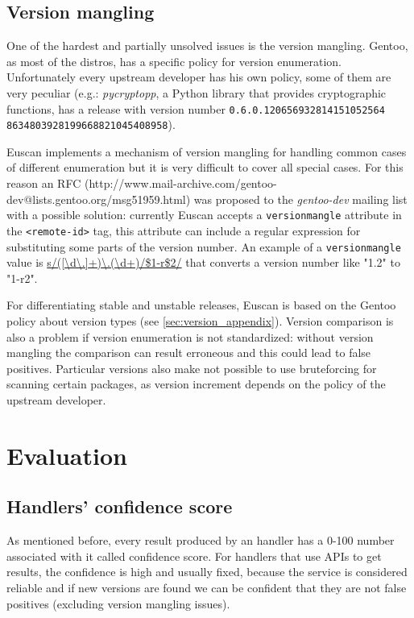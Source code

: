 \subsection{Version mangling}
One of the hardest and partially unsolved issues is the version mangling. Gentoo, as most of the distros, has a specific policy for version enumeration. Unfortunately every upstream developer has his own policy, some of them are very peculiar (e.g.: \emph{pycryptopp}, a Python library that provides cryptographic functions, has a release with version number \texttt{0.6.0.120656932814151052564 
8634803928199668821045408958}).

Euscan implements a mechanism of version mangling for handling common cases of different enumeration but it is very difficult to cover all special cases. For this reason an RFC (http://www.mail-archive.com/gentoo-dev@lists.gentoo.org/msg51959.html) was proposed to the \emph{gentoo-dev} mailing list with a possible solution: currently Euscan accepts a \texttt{versionmangle} attribute in the \texttt{<remote-id>} tag, this attribute can include a regular expression for substituting some parts of the version number. An example of a \texttt{versionmangle} value is \url{s/([\d\.]+)\.(\d+)/\$1-r\$2/} that converts a version number like "1.2" to "1-r2".

For differentiating stable and unstable releases, Euscan is based on the Gentoo policy about version types (see \ref{sec:version_appendix}).
Version comparison is also a problem if version enumeration is not standardized: without version mangling the comparison can result erroneous and this could lead to false positives.
Particular versions also make not possible to use bruteforcing for scanning certain packages, as version increment depends on the policy of the upstream developer.

\section{Evaluation}
\subsection{Handlers' confidence score}
As mentioned before, every result produced by an handler has a 0-100 number associated with it called confidence score. For handlers that use APIs to get results, the confidence is high and usually fixed, because the service is considered reliable and if new versions are found we can be confident that they are not false positives (excluding version mangling issues).

